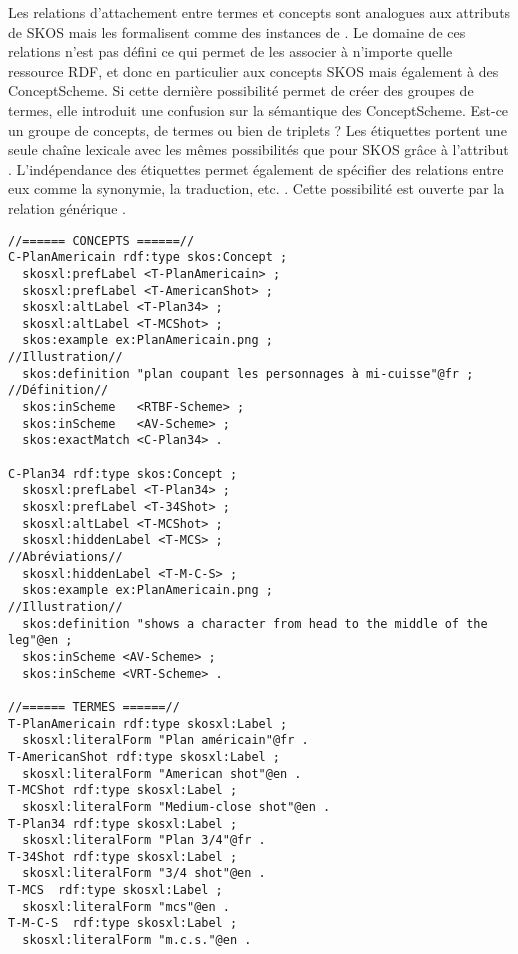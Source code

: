 Les relations d'attachement entre termes et concepts sont analogues aux attributs de SKOS mais les formalisent comme des instances de . 
Le domaine de ces relations n'est pas défini ce qui permet de les associer à n'importe quelle ressource RDF, et donc en particulier aux concepts SKOS mais également à des ConceptScheme. 
Si cette dernière possibilité permet de créer des groupes de termes, elle introduit une confusion sur la sémantique des ConceptScheme.
Est-ce un groupe de concepts, de termes ou bien de triplets ? 
Les étiquettes portent une seule chaîne lexicale avec les mêmes possibilités que pour SKOS grâce à l'attribut . 
L'indépendance des étiquettes permet également de spécifier des relations entre eux comme la synonymie, la traduction, etc. \cite{Pastor2009a}. 
Cette possibilité est ouverte par la relation générique . 


\begin{Verbatim}[fontsize=\small,formatcom=\color{black!70}]
//====== CONCEPTS ======//
C-PlanAmericain rdf:type skos:Concept ; 
  skosxl:prefLabel <T-PlanAmericain> ;
  skosxl:prefLabel <T-AmericanShot> ;
  skosxl:altLabel <T-Plan34> ;
  skosxl:altLabel <T-MCShot> ;
  skos:example ex:PlanAmericain.png ;                               //Illustration//
  skos:definition "plan coupant les personnages à mi-cuisse"@fr ;   //Définition//
  skos:inScheme   <RTBF-Scheme> ;
  skos:inScheme   <AV-Scheme> ;
  skos:exactMatch <C-Plan34> .

C-Plan34 rdf:type skos:Concept ;
  skosxl:prefLabel <T-Plan34> ;
  skosxl:prefLabel <T-34Shot> ;
  skosxl:altLabel <T-MCShot> ;
  skosxl:hiddenLabel <T-MCS> ;                                           //Abréviations//
  skosxl:hiddenLabel <T-M-C-S> ;
  skos:example ex:PlanAmericain.png ;                                   //Illustration//
  skos:definition "shows a character from head to the middle of the leg"@en ;
  skos:inScheme <AV-Scheme> ;
  skos:inScheme <VRT-Scheme> .

//====== TERMES ======//
T-PlanAmericain rdf:type skosxl:Label ;
  skosxl:literalForm "Plan américain"@fr .
T-AmericanShot rdf:type skosxl:Label ;
  skosxl:literalForm "American shot"@en .
T-MCShot rdf:type skosxl:Label ;
  skosxl:literalForm "Medium-close shot"@en .
T-Plan34 rdf:type skosxl:Label ;
  skosxl:literalForm "Plan 3/4"@fr .
T-34Shot rdf:type skosxl:Label ;
  skosxl:literalForm "3/4 shot"@en .
T-MCS  rdf:type skosxl:Label ;
  skosxl:literalForm "mcs"@en .
T-M-C-S  rdf:type skosxl:Label ;
  skosxl:literalForm "m.c.s."@en .
\end{Verbatim}


